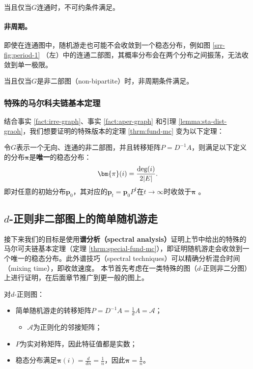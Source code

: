 \begin{fact}
    \label{fact:irre-graph}
    当且仅当$G$连通时，不可约条件满足。
\end{fact}

\paragraph{非周期。}即使在连通图中，随机游走也可能不会收敛到一个稳态分布，例如图 \ref{srr-fig:period-1} （左）中的连通二部图，其概率分布会在两个分布之间振荡，无法收敛到单一极限。

\begin{fact}
    \label{fact:aper-graph}
    当且仅当$G$是非二部图（non-bipartite）时，非周期条件满足。
\end{fact}



    \subsubsection{特殊的马尔科夫链基本定理}
        
    结合事实 \ref{fact:irre-graph}、事实 \ref{fact:aper-graph} 和引理 \ref{lemma:sta-dist-graoh}，我们想要证明的特殊版本的定理 \ref{thrm:fund-mc} 变为以下定理：

    \begin{theorem}
        \label{thrm:special-fund-mc}
        令$G$表示一个无向、连通的非二部图，并且转移矩阵$P=D^{-1}A$，则满足以下定义的分布$\bm{\pi}$是\textbf{唯一}的稳态分布：
        \[
            \bm{\pi}(i)=\frac{\textup{deg}(i)}{2|E|}.
        \]
        即对任意的初始分布$\bm{p}_0$，其对应的$\bm{p}_t=\bm{p}_0P^t$在$t\to \infty$时收敛于$\bm{\pi}$%
            。
    \end{theorem}
        


\subsection{$d$-正则非二部图上的简单随机游走}

    接下来我们的目标是使用\textbf{谱分析（spectral analysis）}证明上节中给出的特殊的马尔可夫链基本定理（定理 \ref{thrm:special-fund-mc}），即证明随机游走会收敛到一个唯一的稳态分布。此外谱技巧（spectral techniques）可以精确分析混合时间（mixing time），即收敛速度。 本节首先考虑在一类特殊的图（$d$-正则非二分图）上进行证明，在后面章节推广到更一般的图上。

    对$d$-正则图：
    \begin{itemize}
        \item 简单随机游走的转移矩阵$P=D^{-1}A=\frac{1}{d}A=\mathcal{A}$；
        \begin{itemize}
            \item $\mathcal{A}$为正则化的邻接矩阵；
        \end{itemize}
        \item $P$为实对称矩阵，因此特征值都是实数；
        \item 稳态分布满足$\bm{\pi}(i)=\frac{d}{dn}=\frac{1}{n}$，因此$\bm{\pi}=\frac{\bm{1}}{n}$。
    \end{itemize}

